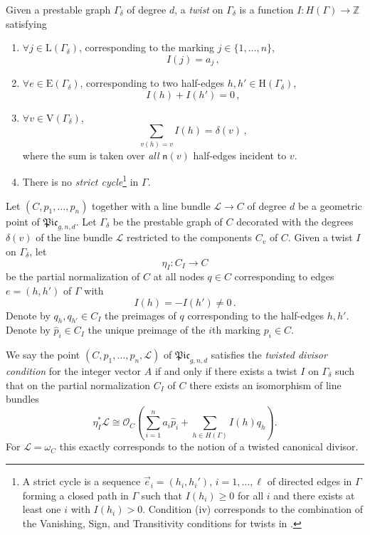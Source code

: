 \documentclass[a4paper,12pt]{article} %
\def\E{\mathrm{E}}
\def\L{\mathrm{L}}
\def\V{\mathrm{V}}
\def\H{\mathrm{H}}
\theoremstyle{definition}
\theoremstyle{plain}%
\newcommand{\Picabs}{\mathfrak{Pic}}
\begin{document}
Given a prestable graph $\Gamma_{\delta}$ of degree $d$, a \emph{twist} on $\Gamma_\delta$ is a function $I: H(\Gamma) \to \mathbb{Z}$ satisfying
\begin{enumerate}
\item[(i)] $\forall j\in \L(\Gamma_\delta)$, corresponding to
 the marking $j\in \{1,\ldots, n\}$,
$$I(j)=a_j\, ,$$
\item[(ii)] $\forall e \in \E(\Gamma_\delta)$, corresponding to two half-edges
$h,h' \in \H(\Gamma_\delta)$,
$$I(h)+I(h')=0 \, ,$$
\item[(iii)] $\forall v\in \V(\Gamma_\delta)$,
$$\sum_{v(h)= v} I(h)= \delta(v) \, ,$$ 
where the sum is taken over {\em all} $\mathsf{n}(v)$ half-edges incident 
to $v$.%
\item[(iv)] There is no \emph{strict cycle}\footnote{A strict cycle 
 is a sequence $\vec e_i = (h_i, h_i')$, $i=1, \ldots, \ell$ of directed edges in $\Gamma$ forming a closed path in $\Gamma$ such that $I(h_i) \geq 0$ for all $i$ and there exists at least one $i$ with $I(h_i)>0$. Condition (iv)
corresponds to the combination of the Vanishing, Sign, and Transitivity conditions for twists in \cite[Section 0.3]{Farkas2016The-moduli-spac}.} in $\Gamma$.
\end{enumerate}


Let $(C,p_1, \ldots, p_n)$ together with a line bundle $\mathcal{L} \to C$ of degree $d$ be a geometric point of $\Picabs_{g,n,d}$. Let $\Gamma_\delta$ be the prestable graph of $C$ decorated with the degrees $\delta(v)$ of the line bundle $\mathcal{L}$ restricted to the components $C_v$ of $C$. Given a twist $I$ on $\Gamma_\delta$, let
\[\eta_I : C_I \to C\]
be the partial normalization of $C$ at all nodes $q \in C$ corresponding to edges $e=(h,h')$ of $\Gamma$ with $$I(h) = -I(h') \neq 0\, .$$
Denote by $q_h, q_{h'} \in C_I$ the preimages of $q$ corresponding to the half-edges $h,h'$. Denote by $\widehat{p}_i \in C_I$ the unique preimage of the $i$th marking $p_i \in C$.

We say the point $(C,p_1, \ldots, p_n, \mathcal{L})$ of $\Picabs_{g,n,d}$ satisfies the \emph{twisted divisor condition} for the integer vector $A$ if and only if there exists a twist $I$ on $\Gamma_\delta$ such that on the partial normalization $C_I$ of $C$ there exists an isomorphism of line bundles
\begin{equation}\label{eq:twisted_diff_condition}
    \eta_I^* \mathcal{L} \cong  \mathcal{O}_C\left(\sum_{i=1}^n a_i \widehat{p}_i + \sum_{h \in H(\Gamma)} I(h) q_h \right).
\end{equation}
For $\mathcal{L}=\omega_C$ this exactly corresponds to the notion \cite[Definition 1]{Farkas2016The-moduli-spac} of a twisted canonical divisor. 
\end{document}
